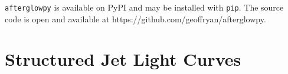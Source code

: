 \documentclass[twocolumn]{aastex62}
\newcommand{\afterglowpy}{{\tt afterglowpy}}
\newcommand{\boxfit}{{\tt BoxFit}}
\newcommand{\thobs}{\ensuremath{\theta_{\mathrm{obs}}}}
\newcommand{\thC}{\ensuremath{\theta_{\mathrm{c}}}}
\newcommand{\epse}{\ensuremath{\varepsilon_{\mathrm{e}}}}
\newcommand{\epsB}{\ensuremath{\varepsilon_{\mathrm{B}}}}
\newcommand{\dL}{\ensuremath{d_{\mathrm{L}}}}
\newcommand{\Eiso}{\ensuremath{E_{\mathrm{iso}}}}
\begin{document}
%
%


\afterglowpy{} is available on PyPI and may be installed with {\tt pip}.  The source code is open and available at https://github.com/geoffryan/afterglowpy.

\section{Structured Jet Light Curves}\label{sec:structuredJets}
\end{document}
